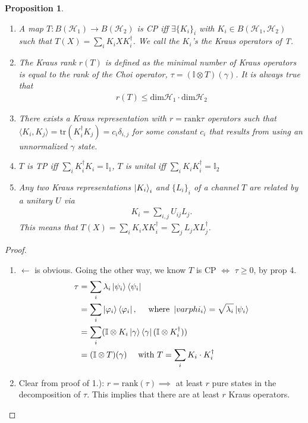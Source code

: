 \documentclass[10pt,oneside,longbibliography]{report}
\newtheorem{proposition}{Proposition}[section]
\begin{document}
\begin{proposition}
\begin{enumerate}
    \item A map $T:B(\mathcal{H}_1)\rightarrow B(\mathcal{H}_2)$ is CP iff $\exists \{K_i\}_i$ with $K_i \in B(\mathcal{H}_1,\mathcal{H}_2)$ such that $T(X) = \sum_i K_i X K_i^{\dagger}$. We call the $K_i$'s the Kraus operators of T. 
    \item The Kraus rank $r(T)$ is defined as the minimal number of Kraus operators is equal to the rank of the Choi operator, $\tau = (\mathbb{I}\otimes T)(\gamma)$. It is always true that 
    \begin{align}
        r(T) \leq \text{dim}\mathcal{H}_1\cdot\text{dim}\mathcal{H}_2
    \end{align}
    \item There exists a Kraus representation with $r=\text{rank}\tau$ operators such that $\langle K_i,K_j\rangle=\text{tr}(K_i^{\dagger} K_j) = c_i \delta_{i,j}$ for some constant $c_i$ that results from using an unnormalized $\gamma$ state. 
    \item $T$ is TP iff $\sum_i K_i^{\dagger}K_i = \mathbb{I}_1$, $T$ is unital iff $\sum_i K_i K_i^{\dagger} = \mathbb{I}_2$
    \item Any two Kraus representations $\ket{K_i}_i$ and $\{L_i\}_i$ of a channel $T$ are related by a unitary $U$ via 
    \begin{align}
        K_i = \sum_{i,j} U_{ij}L_j.
    \end{align}
    This means that $T(X)=\sum_i K_i X K_i^{\dagger} = \sum_j L_j X L_j^{\dagger}$.
\end{enumerate}
\end{proposition}

\begin{tcolorbox}[colframe=black,breakable, colback=black!5, arc=0pt, outer arc=0pt,boxrule=0.5pt]
\begin{proof}
\begin{enumerate}
    \item $\leftarrow$ is obvious. Going the other way, we know $T$ is CP $\Leftrightarrow$ $\tau \geq 0$, by prop 4. 
    \begin{align}
        \tau &=\sum_i \lambda_i \ket{\psi_i}\bra{\psi_i} \\
        &= \sum_i \ket{\varphi_i}\bra{\varphi_i}, \quad \text{ where } \ket{varphi_i}=\sqrt{\lambda_i} \ket{\psi_i}\\
        &= \sum_i (\mathbb{I}\otimes K_i \ket{\gamma}\bra{\gamma} (\mathbb{I}\otimes K_i^{\dagger}))\\
        &=(\mathbb{I}\otimes T)(\gamma) \quad \text{ with } T= \sum_i K_i \cdot K_i^{\dagger}
    \end{align}
    \item Clear from proof of 1.): $r=\text{rank}(\tau) \implies$ at least $r$ pure states in the decomposition of $\tau$. This implies that there are at least $r$ Kraus operators. 
\end{enumerate}
\end{proof}
\end{tcolorbox}



{}

\end{document}

